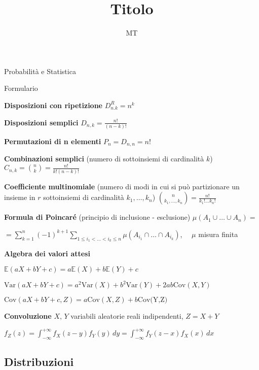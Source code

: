 \documentclass[openany]{book} %
\title{Titolo}
\date{}
\author{MT}
\begin{document}
\begin{center}
\Large Probabilità e Statistica 

\large Formulario
\end{center}

\textbf{Disposizioni con ripetizione} $D^R_{n.k}=n^k$

\textbf{Disposizioni semplici} $D_{n,k}=\frac{n!}{(n-k)!}$

\textbf{Permutazioni di n elementi} \quad $P_n = D_{n,n}=n!$

\textbf{Combinazioni semplici} (numero di sottoinsiemi di cardinalità $k$) \quad $C_{n,k}=\binom {n}{k} = \frac{n!}{k!(n-k)!}$

\textbf{Coefficiente multinomiale} (numero di modi in cui si può partizionare un insieme in $r$ sottoinsiemi di cardinalità $k_1,\dots,k_n$) \quad $\binom {n}{k_1,\dots,k_n}=\frac{n!}{k_1 ! \dots k_n !}$ 

\textbf{Formula di Poincaré} (principio di inclusione - esclusione) \quad $\mu(A_1 \cup \dots \cup A_n) =$ 

$= \sum_{k=1}^n (-1)^{k+1}\sum_{1\leq i_1 < \dots <i_k \leq n}\mu(A_{i_1}\cap \dots \cap A_{i_k})$, $\quad \mu$ misura finita

\textbf{Algebra dei valori attesi}

$\mathbb {E}(aX+bY+c)= a\mathbb{E}(X)+b \mathbb{E}(Y)+c$

$\text {Var}(aX+bY+c)= a^2 \text{Var}(X)+b^2 \text{Var}(Y)+2ab\text{Cov}(X,Y)$

$\text{Cov}(aX+bY+c,Z) = a \text{Cov}(X,Z)+b \text{Cov(Y,Z)}$

\textbf{Convoluzione} $X,\,Y$ variabili aleatorie reali indipendenti, $Z=X+Y$

$f_Z(z) = \int_{-\infty}^{+\infty}f_X(z-y)f_Y(y)\,dy = \int_{-\infty}^{+\infty}f_Y(z-x)f_X(x)\,dx$



\subsection*{Distribuzioni}
\end{document}
